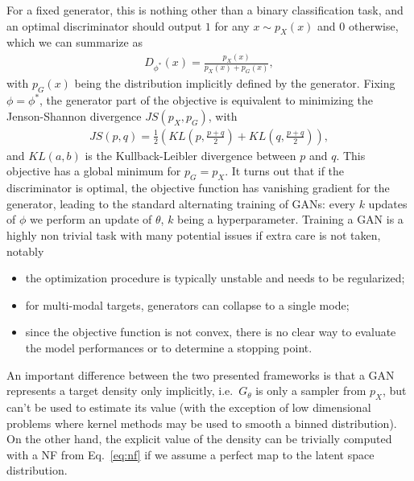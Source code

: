 %
For a fixed generator, this is nothing other than a binary classification task, and an optimal discriminator should output $1$ for any $x \sim p_{X}(x)$ and $0$ otherwise, which we can summarize as
%
\begin{align}
D_{\phi^{*}}(x) = \frac{p_{X}(x)}{p_{X}(x) + p_{G}(x)},
\end{align}
%
with $p_{G}(x)$ being the distribution implicitly defined by the generator. 
Fixing $\phi = \phi^{*}$, the generator part of the objective is equivalent to minimizing the Jenson-Shannon divergence $JS(p_{X}, p_{G})$, with
%
\begin{align}
JS\left(p, q\right) = \frac{1}{2} \left(KL\left(p, \frac{p + q}{2}\right) + KL\left(q, \frac{p + q}{2}\right) \right),
\end{align}
%
and $KL(a, b)$ is the Kullback-Leibler divergence between $p$ and $q$. This objective has a global minimum for $p_{G} = p_{X}$.
It turns out that if the discriminator is optimal, the objective function has vanishing gradient for the generator, leading to the standard alternating training of GANs: every $k$ updates of $\phi$ we perform an update of $\theta$, $k$ being a hyperparameter.
Training a GAN is a highly non trivial task with many potential issues if extra care is not taken, notably
\begin{itemize}
\item
the optimization procedure is typically unstable and needs to be regularized;
\item
for multi-modal targets, generators can collapse to a single mode;
\item
since the objective function is not convex, there is no clear way to evaluate the model performances or to determine a stopping point.
\end{itemize}

An important difference between the two presented frameworks is that a GAN represents a target density only implicitly, i.e.\ $G_{\theta}$ is only a sampler from $p_{X}$, but can't be used to estimate its value (with the exception of low dimensional problems where kernel methods may be used to smooth a binned distribution). On the other hand, the explicit value of the density can be trivially computed with a NF from Eq.~\ref{eq:nf} if we assume a perfect map to the latent space distribution.

